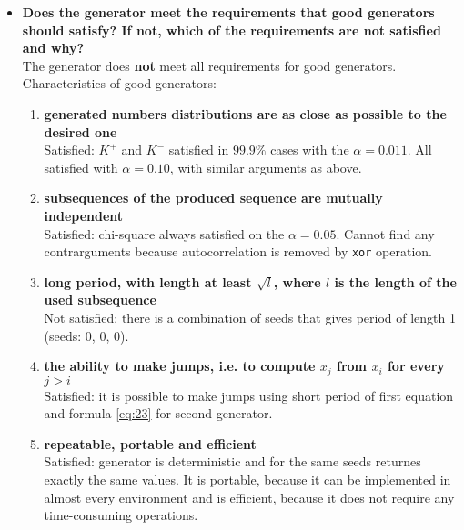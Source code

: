 \documentclass[a4paper,10pt]{article}
\begin{document}
\begin{itemize}
 \item \textbf{Does the generator meet the requirements that good generators should satisfy? If not, which of the requirements are not satisfied and why?} \\
  The generator does \textbf{not} meet all requirements for good generators. \\
  Characteristics of good generators:
   \begin{enumerate}
    \item \textbf{generated numbers distributions are as close as possible to the desired one} \\
    Satisfied: $K^+$ and $K^-$ satisfied in $99.9\%$ cases with the $\alpha = 0.011$. All satisfied with $\alpha = 0.10$, with similar arguments as above.
    \item \textbf{subsequences of the produced sequence are mutually independent} \\
    Satisfied: chi-square always satisfied on the $\alpha = 0.05$. Cannot find any contrarguments because autocorrelation is removed by \texttt{xor} operation. 
    \item \textbf{long period, with length at least $\sqrt{l}$, where $l$ is the length of the used subsequence} \\
    Not satisfied: there is a combination of seeds that gives period of length 1 (seeds: 0, 0, 0).
    \item \textbf{the ability to make jumps, i.e. to compute $x_j$ from $x_i$ for every $j > i$} \\
    Satisfied: it is possible to make jumps using short period of first equation and formula \ref{eq:23} for second generator.
    \item \textbf{repeatable, portable and efficient} \\
    Satisfied: generator is deterministic and for the same seeds returnes exactly the same values. It is portable, because it can be implemented in almost every environment and is efficient, because it does not require any time-consuming operations.   \end{enumerate}
 

\end{itemize}
\end{document}
